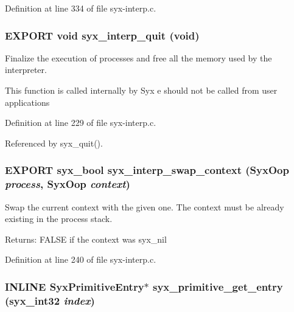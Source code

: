 Definition at line 334 of file syx-interp.c.\hypertarget{syx-interp_8h_7e6dca8bac2c5fc57dae4cb0d76f23eb}{
\subsubsection{\setlength{\rightskip}{0pt plus 5cm}EXPORT void syx\_\-interp\_\-quit (void)}}
\label{syx-interp_8h_7e6dca8bac2c5fc57dae4cb0d76f23eb}


Finalize the execution of processes and free all the memory used by the interpreter.

This function is called internally by Syx e should not be called from user applications 

Definition at line 229 of file syx-interp.c.

Referenced by syx\_\-quit().\hypertarget{syx-interp_8h_aaa4ae62114dedc402940a51711c5c14}{
\subsubsection{\setlength{\rightskip}{0pt plus 5cm}EXPORT {\bf syx\_\-bool} syx\_\-interp\_\-swap\_\-context ({\bf SyxOop} {\em process}, \/  {\bf SyxOop} {\em context})}}
\label{syx-interp_8h_aaa4ae62114dedc402940a51711c5c14}


Swap the current context with the given one. The context must be already existing in the process stack.

\begin{Desc}
\item[Returns:]FALSE if the context was syx\_\-nil \end{Desc}


Definition at line 240 of file syx-interp.c.\hypertarget{syx-interp_8h_029bfe3a640d83819e4734b9994107b8}{
\subsubsection{\setlength{\rightskip}{0pt plus 5cm}INLINE {\bf SyxPrimitiveEntry}$\ast$ syx\_\-primitive\_\-get\_\-entry ({\bf syx\_\-int32} {\em index})}}
\label{syx-interp_8h_029bfe3a640d83819e4734b9994107b8}


